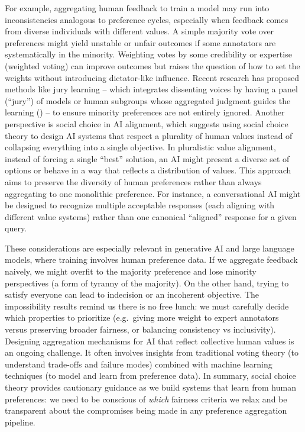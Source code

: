 \documentclass[
  letterpaper,
  numbers=noenddot,
  DIV=11]{scrreprt}
\theoremstyle{definition}
\theoremstyle{plain}
\theoremstyle{plain}
\theoremstyle{remark}
\begin{document}
For example, aggregating human feedback to train a model may run into
inconsistencies analogous to preference cycles, especially when feedback
comes from diverse individuals with different values. A simple majority
vote over preferences might yield unstable or unfair outcomes if some
annotators are systematically in the minority. Weighting votes by some
credibility or expertise (weighted voting) can improve outcomes but
raises the question of how to set the weights without introducing
dictator-like influence. Recent research has proposed methods like jury
learning -- which integrates dissenting voices by having a panel
(``jury'') of models or human subgroups whose aggregated judgment guides
the learning ()
-- to ensure minority preferences are not entirely ignored. Another
perspective is social choice in AI alignment, which suggests using
social choice theory to design AI systems that respect a plurality of
human values instead of collapsing everything into a single objective.
In pluralistic value alignment, instead of forcing a single ``best''
solution, an AI might present a diverse set of options or behave in a
way that reflects a distribution of values. This approach aims to
preserve the diversity of human preferences rather than always
aggregating to one monolithic preference. For instance, a conversational
AI might be designed to recognize multiple acceptable responses (each
aligning with different value systems) rather than one canonical
``aligned'' response for a given query.

These considerations are especially relevant in generative AI and large
language models, where training involves human preference data. If we
aggregate feedback naively, we might overfit to the majority preference
and lose minority perspectives (a form of tyranny of the majority). On
the other hand, trying to satisfy everyone can lead to indecision or an
incoherent objective. The impossibility results remind us there is no
free lunch: we must carefully decide which properties to prioritize
(e.g.~giving more weight to expert annotators versus preserving broader
fairness, or balancing consistency vs inclusivity). Designing
aggregation mechanisms for AI that reflect collective human values is an
ongoing challenge. It often involves insights from traditional voting
theory (to understand trade-offs and failure modes) combined with
machine learning techniques (to model and learn from preference data).
In summary, social choice theory provides cautionary guidance as we
build systems that learn from human preferences: we need to be conscious
of \emph{which} fairness criteria we relax and be transparent about the
compromises being made in any preference aggregation pipeline.
\end{document}

